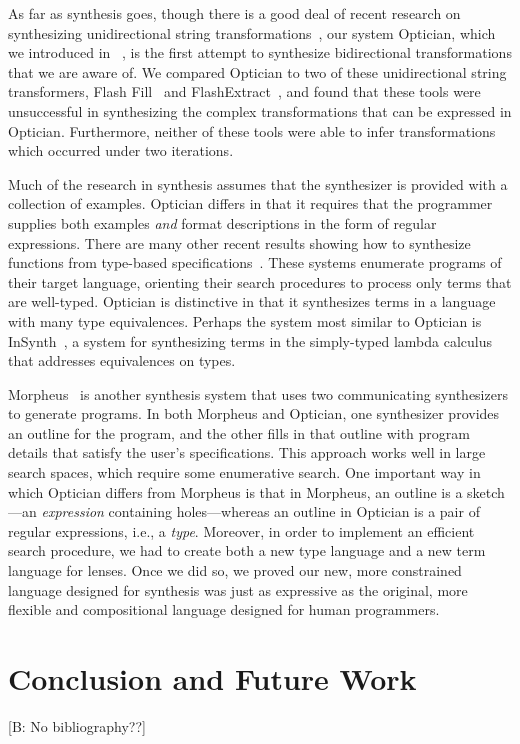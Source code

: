 \documentclass{svproc}
\newcommand{\FINISH}[3]{\ifdraft\textcolor{#1}{[#2: #3]}\fi}
\newcommand{\bcp}[1]{\FINISH{dkred}{B}{#1}}
\begin{document}
As far as synthesis goes, though there is a good deal of recent research on
synthesizing unidirectional string
transformations~\cite{singh2012learning,le-pldi-2014,gulwani-popl-2014,
perelman2014test,Singh:blinkfill}, our system Optician, which we introduced in
~\cite{popl18}, is the first attempt to synthesize bidirectional
transformations that we are aware of. We compared Optician to two of these
unidirectional string transformers, Flash Fill~\cite{gulwani-popl-2014} and
FlashExtract~\cite{le-pldi-2014}, and found that these tools were unsuccessful
in synthesizing the complex transformations that can be expressed in Optician.
Furthermore, neither of these tools were able to infer transformations 
which occurred under two iterations.

Much of the research in synthesis assumes that the synthesizer is provided with
a collection of examples. Optician differs in that it requires that the
programmer supplies both examples {\em and} format descriptions in the form of
regular expressions. There are many other recent results showing how to
synthesize functions from type-based
specifications~\cite{augustsson-2004,osera+:pldi15,
feser-pldi-2015,scherer-icfp-2015,frankle+:popl16,armando+:pldi16}.
These systems enumerate programs of their target language, orienting their
search procedures to process only terms that are well-typed.
Optician is distinctive in that it synthesizes terms in a language with many
type equivalences. 
Perhaps the system most similar to Optician is InSynth~\cite{gvero-pldi-2013}, a
system for synthesizing terms in the simply-typed lambda calculus that addresses
equivalences on types.  

Morpheus~\cite{morpheus} is another synthesis system that uses two
communicating synthesizers to generate programs.  In both Morpheus and
Optician, one synthesizer provides an 
outline for the program, and the other fills in that outline with program
details that satisfy the user's specifications.
This approach works well in large search spaces, which
require some enumerative search.
One important way in which Optician differs from Morpheus is that in
Morpheus, an outline is a sketch---an
\emph{expression}
containing holes---whereas
an outline in Optician is a pair of regular
expressions, i.e., a 
\emph{type}.  Moreover, in order to implement an efficient
search procedure, we had to create both a new type language and a new
term language for lenses.  Once we did so, we proved our new, more
constrained language
designed for synthesis was just as expressive as the original, more
flexible and compositional language designed for human programmers.




\section{Conclusion and Future Work}
\label{concl}

\bcp{No bibliography??}
\end{document}
